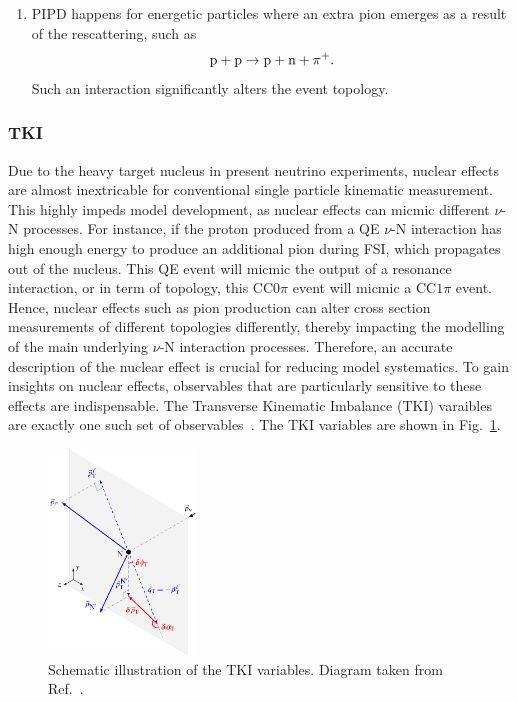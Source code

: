 \begin{enumerate}
    \item 
    PIPD happens for energetic particles where an extra pion emerges as a result of the rescattering, such as
    \begin{equation}
        \textrm{p} + \textrm{p} \rightarrow \textrm{p} + \textrm{n} + \pi^+.
    \end{equation}
    Such an interaction significantly alters the event topology. 
  
    \end{enumerate}
  
  
  

    \subsubsection{TKI}
    \label{sec:nuint-tki}
    Due to the heavy target nucleus in present neutrino experiments, nuclear effects are almost inextricable for conventional single particle kinematic measurement.
    This highly impeds model development, as nuclear effects can micmic different $\nu$-N processes.
    For instance, if the proton produced from a QE $\nu$-N interaction has high enough energy to produce an additional pion during FSI, which propagates out of the nucleus.
    This QE event will micmic the output of a resonance interaction, or in term of topology, this CC$0\pi$ event will micmic a CC$1\pi$ event.
    Hence, nuclear effects such as pion production can alter cross section measurements of different topologies differently, thereby impacting the modelling of the main underlying $\nu$-N interaction processes.
    Therefore, an accurate description of the nuclear effect is crucial for reducing model systematics.
    To gain insights on nuclear effects, observables that are particularly sensitive to these effects are indispensable. 
    The Transverse Kinematic Imbalance (TKI) varaibles are exactly one such set of observables~\cite{Lu:2015hea, Lu:2015tcr}.
    The TKI variables are shown in Fig.~\ref{fig:stki}.
    \begin{figure}[!htb] 	
        \centering 		
        \includegraphics[width=0.35\textwidth]{figures/stki.eps}
        \caption{\label{fig:stki} Schematic illustration of the TKI variables. Diagram taken from Ref.~\cite{Lu:2015tcr}.} 
    \end{figure}

